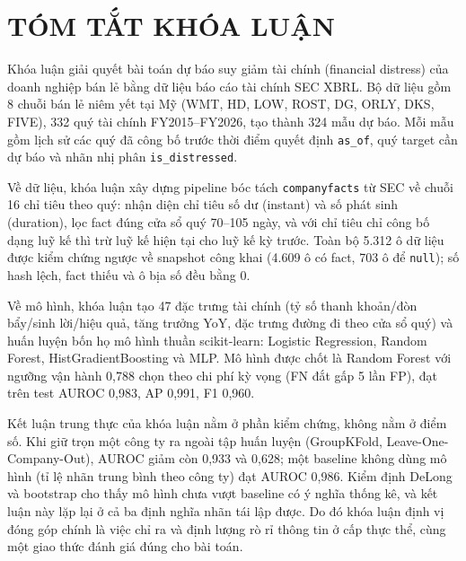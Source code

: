 \documentclass[13pt,a4paper]{extreport}
\begin{document}
\chapter*{TÓM TẮT KHÓA LUẬN}
Khóa luận giải quyết bài toán dự báo suy giảm tài chính (financial distress) của doanh nghiệp bán
lẻ bằng dữ liệu báo cáo tài chính SEC XBRL. Bộ dữ liệu gồm 8 chuỗi bán lẻ niêm yết tại Mỹ
(WMT, HD, LOW, ROST, DG, ORLY, DKS, FIVE), 332 quý tài chính FY2015--FY2026, tạo thành 324 mẫu dự
báo. Mỗi mẫu gồm lịch sử các quý đã công bố trước thời điểm quyết định \texttt{as\_of}, quý target
cần dự báo và nhãn nhị phân \texttt{is\_distressed}.

Về dữ liệu, khóa luận xây dựng pipeline bóc tách \texttt{companyfacts} từ SEC về chuỗi 16 chỉ tiêu
theo quý: nhận diện chỉ tiêu số dư (instant) và số phát sinh (duration), lọc fact đúng cửa sổ quý
70--105 ngày, và với chỉ tiêu chỉ công bố dạng luỹ kế thì trừ luỹ kế hiện tại cho luỹ kế kỳ trước.
Toàn bộ 5.312 ô dữ liệu được kiểm chứng ngược về snapshot công khai (4.609 ô có fact, 703 ô để
\texttt{null}); số hash lệch, fact thiếu và ô bịa số đều bằng 0.

Về mô hình, khóa luận tạo 47 đặc trưng tài chính (tỷ số thanh khoản/đòn bẩy/sinh lời/hiệu quả,
tăng trưởng YoY, đặc trưng đường đi theo cửa sổ quý) và huấn luyện bốn họ mô hình thuần
scikit-learn: Logistic Regression, Random Forest, HistGradientBoosting và MLP. Mô hình được chốt là
Random Forest với ngưỡng vận hành 0,788 chọn theo chi phí kỳ vọng (FN đắt gấp 5 lần FP), đạt trên
test AUROC 0,983, AP 0,991, F1 0,960.

Kết luận trung thực của khóa luận nằm ở phần kiểm chứng, không nằm ở điểm số. Khi giữ trọn một công
ty ra ngoài tập huấn luyện (GroupKFold, Leave-One-Company-Out), AUROC giảm còn 0,933 và 0,628; một
baseline không dùng mô hình (tỉ lệ nhãn trung bình theo công ty) đạt AUROC 0,986. Kiểm định DeLong
và bootstrap cho thấy mô hình chưa vượt baseline có ý nghĩa thống kê, và kết luận này lặp lại ở cả
ba định nghĩa nhãn tái lập được. Do đó khóa luận định vị đóng góp chính là việc chỉ ra và định lượng
rò rỉ thông tin ở cấp thực thể, cùng một giao thức đánh giá đúng cho bài toán.
\clearpage

\end{document}

